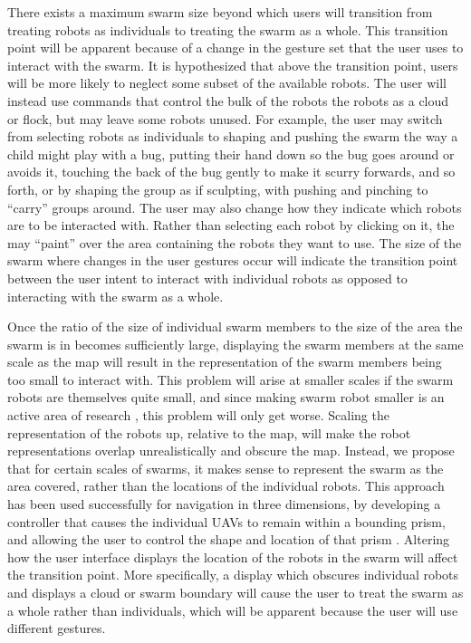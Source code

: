 \documentclass[]{article}
\begin{document}
There exists a maximum swarm size beyond which users will transition from treating robots as individuals to treating the swarm as a whole. 
This transition point will be apparent because of a change in the gesture set that the user uses to interact with the swarm. 
It is hypothesized that above the transition point, users will be more likely to neglect some subset of the available robots. 
The user will instead use commands that control the bulk of the robots the robots as a cloud or flock, but may leave some robots unused. 
For example, the user may switch from selecting robots as individuals to shaping and pushing the swarm the way a child might play with a bug, putting their hand down so the bug goes around or avoids it, touching the back of the bug gently to make it scurry forwards, and so forth, or by shaping the group as if sculpting, with pushing and pinching to ``carry'' groups around. 
The user may also change how they indicate which robots are to be interacted with. 
Rather than selecting each robot by clicking on it, the may ``paint'' over the area containing the robots they want to use. 
The size of the swarm where changes in the user gestures occur will indicate the transition point between the user intent to interact with individual robots as opposed to interacting with the swarm as a whole. 

Once the ratio of the size of individual swarm members to the size of the area the swarm is in becomes sufficiently large, displaying the swarm members at the same scale as the map will result in the representation of the swarm members being too small to interact with. 
This problem will arise at smaller scales if the swarm robots are themselves quite small, and since making swarm robot smaller is an active area of research , this problem will only get worse. 
Scaling the representation of the robots up, relative to the map, will make the robot representations overlap unrealistically and obscure the map. 
Instead, we propose that for certain scales of swarms, it makes sense to represent the swarm as the area covered, rather than the locations of the individual robots.
This approach has been used successfully for navigation in three dimensions, by developing a controller that causes the individual UAVs to remain within a bounding prism, and allowing the user to control the shape and location of that prism \cite{ayanian2014controlling}.
Altering how the user interface displays the location of the robots in the swarm will affect the transition point. 
More specifically, a display which obscures individual robots and displays a cloud or swarm boundary will cause the user to treat the swarm as a whole rather than individuals, which will be apparent because the user will use different gestures. 
\end{document}
